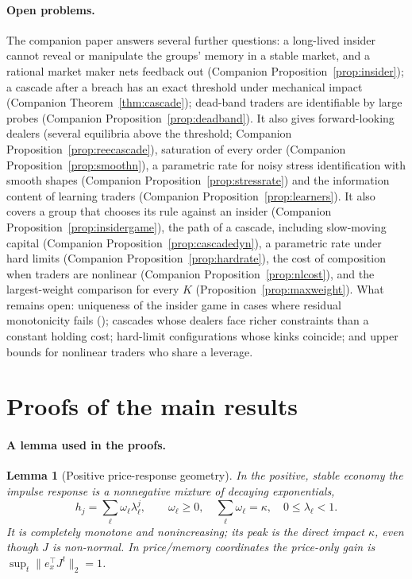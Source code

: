 \documentclass[12pt]{article}
\newtheorem{lemma}[theorem]{Lemma}
\theoremstyle{definition}
\theoremstyle{remark}
\begin{document}
\paragraph{Open problems.} The companion paper \citep{niroula2026c} answers several further questions: a long-lived insider cannot reveal or manipulate the groups' memory in a stable market, and a rational market maker nets feedback out (Companion Proposition~\ref{prop:insider}); a cascade after a breach has an exact threshold under mechanical impact (Companion Theorem~\ref{thm:cascade}); dead-band traders are identifiable by large probes (Companion Proposition~\ref{prop:deadband}). It also gives forward-looking dealers (several equilibria above the threshold; Companion Proposition~\ref{prop:reecascade}), saturation of every order (Companion Proposition~\ref{prop:smoothn}), a parametric rate for noisy stress identification with smooth shapes (Companion Proposition~\ref{prop:stressrate}) and the information content of learning traders (Companion Proposition~\ref{prop:learners}). It also covers a group that chooses its rule against an insider (Companion Proposition~\ref{prop:insidergame}), the path of a cascade, including slow-moving capital (Companion Proposition~\ref{prop:cascadedyn}), a parametric rate under hard limits (Companion Proposition~\ref{prop:hardrate}), the cost of composition when traders are nonlinear (Companion Proposition~\ref{prop:nlcost}), and the largest-weight comparison for every $K$ (Proposition~\ref{prop:maxweight}). What remains open: uniqueness of the insider game in cases where residual monotonicity fails (\citealp[Proposition~S17.3]{niroula2026full}); cascades whose dealers face richer constraints than a constant holding cost; hard-limit configurations whose kinks coincide; and upper bounds for nonlinear traders who share a leverage.



\section{Proofs of the main results}\label{app:proofs}

\paragraph{A lemma used in the proofs.}
\begin{lemma}[Positive price-response geometry]\label{lem:cm}
In the positive, stable economy the impulse response is a nonnegative mixture of decaying exponentials,
\[
h_j=\sum_\ell \omega_\ell\lambda_\ell^j,\qquad \omega_\ell\ge0,\quad \sum_\ell\omega_\ell=\kappa,\quad 0\le\lambda_\ell<1 .
\]
It is completely monotone and nonincreasing; its peak is the direct impact $\kappa$, even though $J$ is non-normal. In price/memory coordinates the price-only gain is $\sup_t\|e_x^\top J^t\|_2=1$.
\end{lemma}
\end{document}
